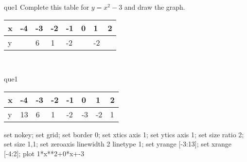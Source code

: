 \documentclass[13.5pt, varwidth=true]{beamer}
\begin{document}
\begin{frame}[shrink=19,fragile]
	\begin{beamercolorbox}[rounded=true, left, shadow=true,wd=14.8cm]{que1}
		 Complete this table for $y = x^{2} - 3$ and draw the graph. \\[0.3cm] \renewcommand{\arraystretch}{1.2}\begin{tabular}{|C|C|C|C|C|C|C|C|} \hline x & -4 & -3 & -2 & -1 & 0 & 1 & 2 \\ \hline y &  & 6 & 1 & -2 &  & -2 & \\ \hline \end{tabular}\\[0.3cm]
	\end{beamercolorbox}
\end{frame}
\begin{frame}[shrink=19,fragile]
	\begin{beamercolorbox}[rounded=true, left, shadow=true,wd=14.8cm]{que1}
		\renewcommand{\arraystretch}{1.2}\begin{tabular}{|C|C|C|C|C|C|C|C|} \hline x & -4 & -3 & -2 & -1 & 0 & 1 & 2 \\ \hline y & 13 & 6 & 1 & -2 & -3 & -2 & 1\\ \hline \end{tabular}\begin{gnuplot}[terminal=pdf] set nokey; set grid; set border 0; set xtics axis 1; set ytics axis 1; set size ratio 2; set size 1,1; set zeroaxis linewidth 2 linetype 1; set yrange [-3:13]; set xrange [-4:2]; plot 1*x**2+0*x+-3 \end{gnuplot}
	\end{beamercolorbox}
\end{frame}
\end{document}
